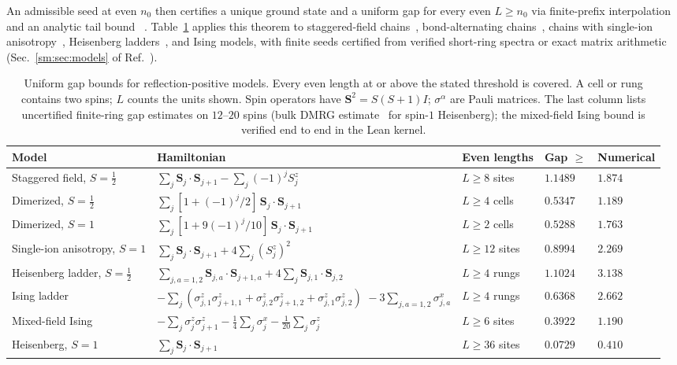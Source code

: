 An admissible seed at even $n_0$ then certifies a unique ground state
and a uniform gap for every even $L\ge n_0$ via finite-prefix
interpolation and an analytic tail bound%
~.
Table~\ref{tab:models} applies this theorem to staggered-field
chains~\cite{Oshikawa1997Field}, bond-alternating
chains~\cite{Barnes1999Alternating,Yamamoto1995Elementary}, chains
with single-ion anisotropy~\cite{Chen2003Ground}, Heisenberg
ladders~\cite{Dagotto1996Surprises}, and Ising models, with finite
seeds certified from verified short-ring spectra or exact matrix
arithmetic (Sec.~\ref{sm:sec:models} of Ref.~\cite{SM}).
\begin{table}[t]
\caption{Uniform gap bounds for reflection-positive models. Every even
length at or above the stated threshold is covered. A cell or rung
contains two spins; $L$ counts the units shown. Spin operators have
$\bm S^2=S(S+1)I$; $\sigma^\alpha$ are Pauli matrices. The last column
lists uncertified finite-ring gap estimates on $12$--$20$ spins (bulk
DMRG estimate~\cite{White1993Numerical} for spin-$1$ Heisenberg); the
mixed-field Ising bound is verified end to end in the Lean kernel.}
\label{tab:models}
\setlength{\tabcolsep}{4pt}
\renewcommand{\arraystretch}{1.25}
\begin{tabular}{@{}p{}p{}lll@{}}
\toprule
Model & Hamiltonian & Even lengths & Gap $\ge$ & Numerical\\
\midrule
Staggered field, $S=\tfrac12$
 & $\sum_j\bm S_j\cdot\bm S_{j+1}-\sum_j(-1)^jS_j^z$
 & $L\ge8$ sites & $1.1489$ & $1.874$\\
Dimerized, $S=\tfrac12$
 & $\sum_j[1+(-1)^j/2]\,\bm S_j\cdot\bm S_{j+1}$
 & $L\ge4$ cells & $0.5347$ & $1.189$\\
Dimerized, $S=1$
 & $\sum_j[1+9(-1)^j/10]\,\bm S_j\cdot\bm S_{j+1}$
 & $L\ge2$ cells & $0.5288$ & $1.763$\\
Single-ion anisotropy, $S=1$
 & $\sum_j\bm S_j\cdot\bm S_{j+1}+4\sum_j(S_j^z)^2$
 & $L\ge12$ sites & $0.8994$ & $2.269$\\
Heisenberg ladder, \mbox{$S=\tfrac12$}
 & $\sum_{j,a=1,2}\bm S_{j,a}\cdot\bm S_{j+1,a}
    +4\sum_j\bm S_{j,1}\cdot\bm S_{j,2}$
 & $L\ge4$ rungs & $1.1024$ & $3.138$\\
Ising ladder
 & $-\sum_j(\sigma^z_{j,1}\sigma^z_{j+1,1}
    +\sigma^z_{j,2}\sigma^z_{j+1,2}
    +\sigma^z_{j,1}\sigma^z_{j,2})$
   \newline $\displaystyle{}-3\sum_{j,a=1,2}\sigma^x_{j,a}$
 & $L\ge4$ rungs & $0.6368$ & $2.662$\\
Mixed-field Ising
 & $-\sum_j\sigma_j^z\sigma_{j+1}^z
    -\tfrac14\sum_j\sigma_j^x-\tfrac1{20}\sum_j\sigma_j^z$
 & $L\ge6$ sites & $0.3922$ & $1.190$\\
Heisenberg, $S=1$
 & $\sum_j\bm S_j\cdot\bm S_{j+1}$
 & $L\ge36$ sites & $0.0729$ & $0.410$\\
\bottomrule
\end{tabular}
\end{table}

